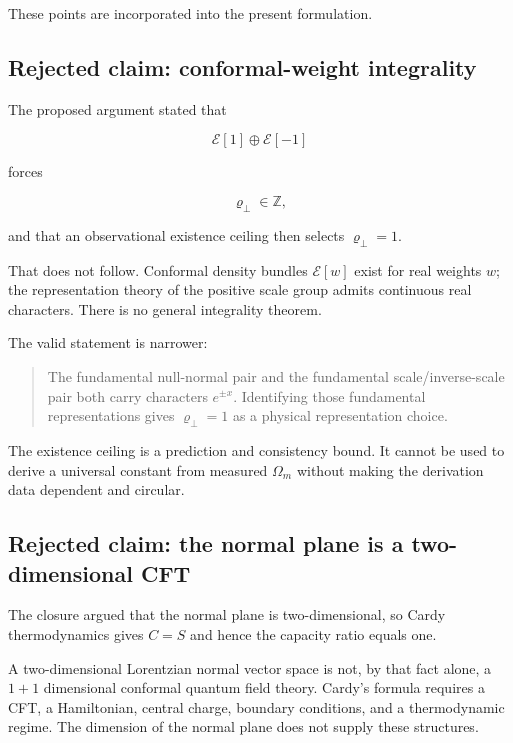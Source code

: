 \documentclass[
  11pt,
  letterpaper,
]{article}
\begin{document}
These points are incorporated into the present formulation.

\subsection{Rejected claim: conformal-weight
integrality}\label{rejected-claim-conformal-weight-integrality}

The proposed argument stated that

\[
\mathcal E[1]\oplus\mathcal E[-1]
\]

forces

\[
\varrho_\perp\in\mathbb Z,
\]

and that an observational existence ceiling then selects
\(\varrho_\perp=1\).

That does not follow. Conformal density bundles \(\mathcal E[w]\) exist
for real weights \(w\); the representation theory of the positive scale
group admits continuous real characters. There is no general integrality
theorem.

The valid statement is narrower:

\begin{quote}
The fundamental null-normal pair and the fundamental scale/inverse-scale
pair both carry characters \(e^{\pm x}\). Identifying those fundamental
representations gives \(\varrho_\perp=1\) as a physical representation
choice.
\end{quote}

The existence ceiling is a prediction and consistency bound. It cannot
be used to derive a universal constant from measured \(\Omega_m\)
without making the derivation data dependent and circular.

\subsection{Rejected claim: the normal plane is a two-dimensional
CFT}\label{rejected-claim-the-normal-plane-is-a-two-dimensional-cft}

The closure argued that the normal plane is two-dimensional, so Cardy
thermodynamics gives \(C=S\) and hence the capacity ratio equals one.

A two-dimensional Lorentzian normal vector space is not, by that fact
alone, a \(1+1\) dimensional conformal quantum field theory. Cardy's
formula requires a CFT, a Hamiltonian, central charge, boundary
conditions, and a thermodynamic regime. The dimension of the normal
plane does not supply these structures.
\end{document}
